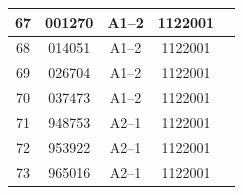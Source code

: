\documentclass[UTF8,10pt,a4paper,fontset=fandol]{ctexart}
\newcommand{\fieldvalue}[1]{#1}
\begin{document}
\begin{center}
\begin{tabular}{|c|c|c|c|c|}
\fieldvalue{67} &
\fieldvalue{001270} &
\fieldvalue{A1--2} &
\fieldvalue{1122001} & \\ \hline

\fieldvalue{68} &
\fieldvalue{014051} &
\fieldvalue{A1--2} &
\fieldvalue{1122001} & \\ \hline

\fieldvalue{69} &
\fieldvalue{026704} &
\fieldvalue{A1--2} &
\fieldvalue{1122001} & \\ \hline

\fieldvalue{70} &
\fieldvalue{037473} &
\fieldvalue{A1--2} &
\fieldvalue{1122001} & \\ \hline

\fieldvalue{71} &
\fieldvalue{948753} &
\fieldvalue{A2--1} &
\fieldvalue{1122001} & \\ \hline

\fieldvalue{72} &
\fieldvalue{953922} &
\fieldvalue{A2--1} &
\fieldvalue{1122001} & \\ \hline

\fieldvalue{73} &
\fieldvalue{965016} &
\fieldvalue{A2--1} &
\fieldvalue{1122001} & \\ \hline


\end{tabular}
\end{center}
\end{document}

